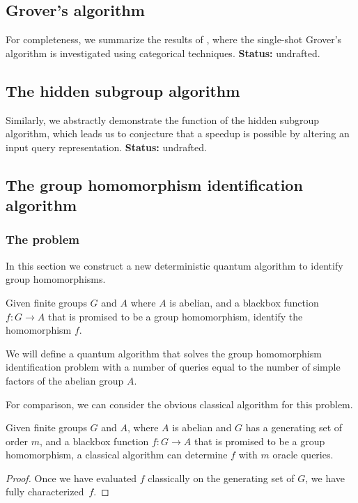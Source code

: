 \subsection{Grover's algorithm}
For completeness, we summarize the results of \cite{vicary-tqa}, where the single-shot Grover's algorithm is investigated using categorical techniques. {\bf Status:} undrafted.

\subsection{The hidden subgroup algorithm}
Similarly, we abstractly demonstrate the function of the hidden subgroup algorithm, which leads us to conjecture that a speedup is possible by altering an input query representation. {\bf Status:} undrafted.

\subsection{\color{blue} The group homomorphism identification algorithm}

\subsubsection*{The problem}

In this section we construct a new deterministic quantum algorithm to identify  group homomorphisms.  
\begin{defn}
Given finite groups $G$ and $A$ where $A$ is abelian, and a blackbox function $f:G\to A$ that is promised to be a group homomorphism, identify the homomorphism $f$.
\end{defn}

\noindent
We will define a quantum algorithm that solves the group homomorphism identification problem with a number of queries equal to the number of simple factors of the abelian group $A$.

For comparison, we can consider the obvious classical algorithm for this problem.
\begin{lemma}
Given finite groups $G$ and $A$, where $A$ is abelian and $G$ has a generating set of order $m$, and a blackbox function $f:G\to A$ that is promised to be a group homomorphism, a classical algorithm can determine $f$ with $m$ oracle queries.
\end{lemma}
\begin{proof}
Once we have evaluated $f$ classically on the generating set of $G$, we have fully characterized~$f$. 
\end{proof}

